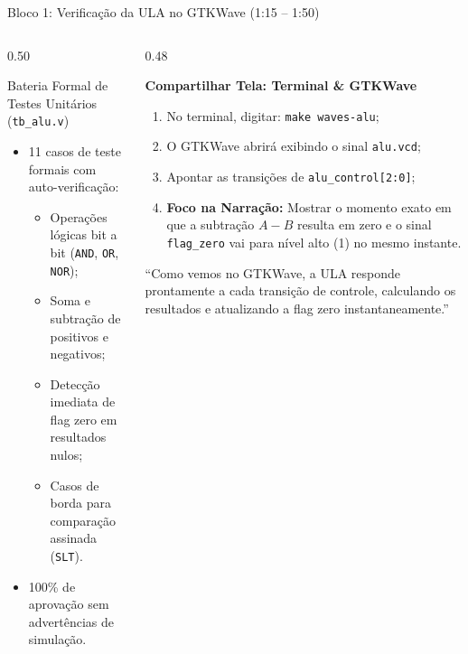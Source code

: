 \documentclass[aspectratio=169, 10pt]{beamer}
\begin{document}
\begin{frame}{Bloco 1: Verificação da ULA no GTKWave (1:15 -- 1:50)}
  \begin{columns}[T]
    \begin{column}{0.50\textwidth}
      \begin{block}{Bateria Formal de Testes Unitários (\texttt{tb\_alu.v})}
        \footnotesize
        \begin{itemize}\setlength{\itemsep}{1pt}
          \item 11 casos de teste formais com auto-verificação:
            \begin{itemize}
              \item Operações lógicas bit a bit (\texttt{AND}, \texttt{OR}, \texttt{NOR});
              \item Soma e subtração de positivos e negativos;
              \item Detecção imediata de flag zero em resultados nulos;
              \item Casos de borda para comparação assinada (\texttt{SLT}).
            \end{itemize}
          \item 100\% de aprovação sem advertências de simulação.
        \end{itemize}
      \end{block}
    \end{column}

    \begin{column}{0.48\textwidth}
      \begin{tcolorbox}[cuebox]
        \textbf{Compartilhar Tela: Terminal \& GTKWave}
        \vspace{1mm}
        \scriptsize
        \begin{enumerate}\setlength{\itemsep}{1pt}
          \item No terminal, digitar: \texttt{make waves-alu};
          \item O GTKWave abrirá exibindo o sinal \texttt{alu.vcd};
          \item Apontar as transições de \texttt{alu\_control[2:0]};
          \item \textbf{Foco na Narração:} Mostrar o momento exato em que a subtração $A - B$ resulta em zero e o sinal \texttt{flag\_zero} vai para nível alto (1) no mesmo instante.
        \end{enumerate}
      \end{tcolorbox}

      \begin{tcolorbox}[speakerbox]
        \scriptsize
        ``Como vemos no GTKWave, a ULA responde prontamente a cada transição de controle, calculando os resultados e atualizando a flag zero instantaneamente.''
      \end{tcolorbox}
    \end{column}
  \end{columns}
\end{frame}
\end{document}
